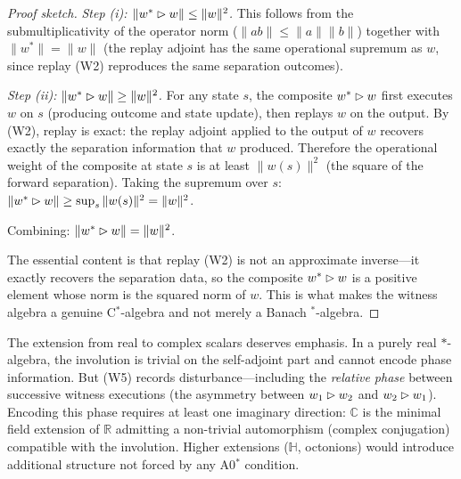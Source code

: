 \begin{theorem}
\begin{proof}[Proof sketch]
\emph{Step (i): $\|w^* \mathbin{\vartriangleright} w\| \leq \|w\|^2$.}
This follows from the submultiplicativity of the operator norm
($\|ab\| \leq \|a\| \|b\|$) together with $\|w^*\| = \|w\|$
(the replay adjoint has the same operational supremum as $w$, since
replay (W2) reproduces the same separation outcomes).

\emph{Step (ii): $\|w^* \mathbin{\vartriangleright} w\| \geq \|w\|^2$.}
For any state $s$, the composite $w^* \mathbin{\vartriangleright} w$ first executes $w$
on $s$ (producing outcome and state update), then replays $w$ on the
output.  By (W2), replay is exact: the replay adjoint applied to the
output of $w$ recovers exactly the separation information that $w$
produced.  Therefore the operational weight of the composite at state $s$
is at least $\|w(s)\|^2$ (the square of the forward separation).
Taking the supremum over $s$:
$\|w^* \mathbin{\vartriangleright} w\| \geq \sup_s \|w(s)\|^2 = \|w\|^2$.

Combining: $\|w^* \mathbin{\vartriangleright} w\| = \|w\|^2$.

The essential content is that replay (W2) is not an approximate
inverse---it exactly recovers the separation data, so the composite
$w^* \mathbin{\vartriangleright} w$ is a positive element whose norm is the squared
norm of $w$.  This is what makes the witness algebra a genuine
C$^*$-algebra and not merely a Banach $^*$-algebra.

\end{proof}
\end{theorem}

\begin{remark}
\label{rem:complex-scalars}
The extension from real to complex scalars deserves emphasis.  In a purely
real $*$-algebra, the involution is trivial on the self-adjoint part and
cannot encode phase information.  But (W5) records disturbance---including
the \emph{relative phase} between successive witness executions (the
asymmetry between $w_1 \mathbin{\vartriangleright} w_2$ and $w_2 \mathbin{\vartriangleright} w_1$).
Encoding this phase requires at least one imaginary direction:
$\mathbb{C}$ is the minimal field extension of $\mathbb{R}$ admitting a
non-trivial automorphism (complex conjugation) compatible with the
involution.  Higher extensions ($\mathbb{H}$, octonions) would introduce
additional structure not forced by any A0$^*$ condition.
\end{remark}

